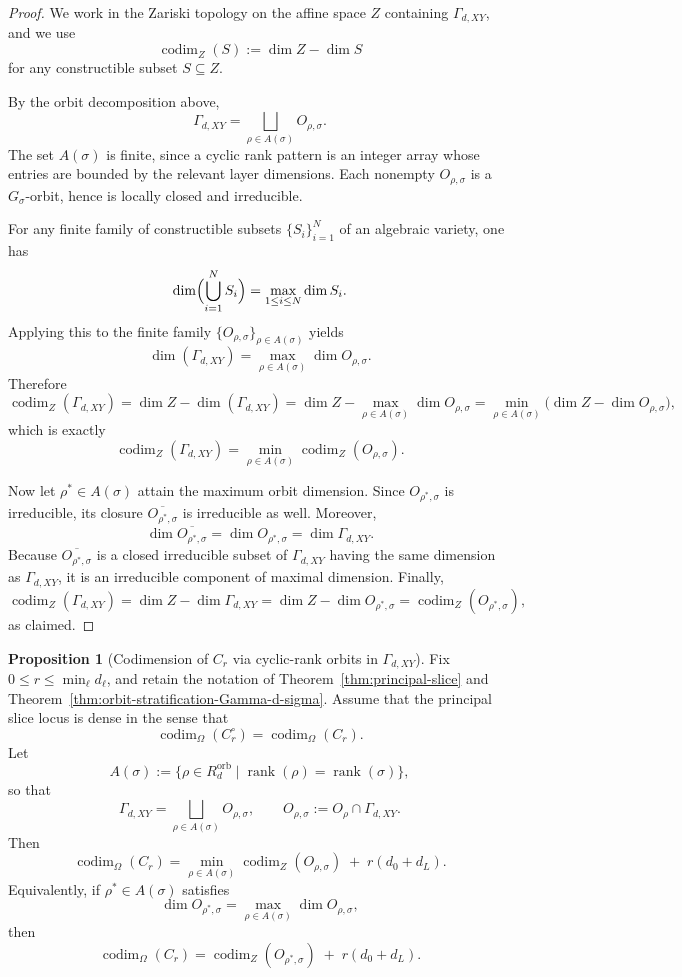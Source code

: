 \documentclass{article}
\newcommand{\rank}{\operatorname{rank}}
\newcommand{\codim}{\operatorname{codim}}
\theoremstyle{definition}
\newtheorem{proposition}[theorem]{Proposition}
\begin{document}
\begin{proof}
We work in the Zariski topology on the affine space $Z$ containing $\Gamma_{d,XY}$, and we use
\[
\codim_Z(S):=\dim Z-\dim S
\]
for any constructible subset $S\subseteq Z$.

By the orbit decomposition above,
\[
\Gamma_{d,XY}
=
\bigsqcup_{\rho \in A(\sigma)} O_{\rho,\sigma}.
\]
The set $A(\sigma)$ is finite, since a cyclic rank pattern is an integer array whose entries are
bounded by the relevant layer dimensions. Each nonempty $O_{\rho,\sigma}$ is a $G_\sigma$-orbit,
hence is locally closed and irreducible.

For any finite family of constructible subsets $\{S_i\}_{i=1}^N$ of an algebraic variety, one has
\[
\dim\Bigl(\bigcup_{i=1}^N S_i\Bigr)=\max_{1\le i\le N}\dim S_i.
\]
Applying this to the finite family $\{O_{\rho,\sigma}\}_{\rho\in A(\sigma)}$ yields
\[
\dim(\Gamma_{d,XY})
=
\max_{\rho\in A(\sigma)} \dim O_{\rho,\sigma}.
\]
Therefore
\[
\codim_Z(\Gamma_{d,XY})
=
\dim Z-\dim(\Gamma_{d,XY})
=
\dim Z-\max_{\rho\in A(\sigma)} \dim O_{\rho,\sigma}
=
\min_{\rho\in A(\sigma)} \bigl(\dim Z-\dim O_{\rho,\sigma}\bigr),
\]
which is exactly
\[
\codim_Z(\Gamma_{d,XY})
=
\min_{\rho\in A(\sigma)} \codim_Z(O_{\rho,\sigma}).
\]

Now let $\rho^\ast\in A(\sigma)$ attain the maximum orbit dimension. Since $O_{\rho^\ast,\sigma}$
is irreducible, its closure $\overline{O_{\rho^\ast,\sigma}}$ is irreducible as well. Moreover,
\[
\dim \overline{O_{\rho^\ast,\sigma}}
=
\dim O_{\rho^\ast,\sigma}
=
\dim \Gamma_{d,XY}.
\]
Because $\overline{O_{\rho^\ast,\sigma}}$ is a closed irreducible subset of $\Gamma_{d,XY}$ having
the same dimension as $\Gamma_{d,XY}$, it is an irreducible component of maximal dimension.
Finally,
\[
\codim_Z(\Gamma_{d,XY})
=
\dim Z-\dim \Gamma_{d,XY}
=
\dim Z-\dim O_{\rho^\ast,\sigma}
=
\codim_Z(O_{\rho^\ast,\sigma}),
\]
as claimed.
\end{proof}
\begin{proposition}[Codimension of $C_r$ via cyclic-rank orbits in $\Gamma_{d,XY}$]
Fix $0 \le r \le \min_\ell d_\ell$, and retain the notation of Theorem~\ref{thm:principal-slice}
and Theorem~\ref{thm:orbit-stratification-Gamma-d-sigma}. Assume that the principal slice locus is
dense in the sense that
\[
\codim_\Omega(C_r^\circ)=\codim_\Omega(C_r).
\]
Let
\[
A(\sigma)
:=
\bigl\{
\rho\in R_d^{\mathrm{orb}}
\;\big|\;
\rank(\rho)=\rank(\sigma)
\bigr\},
\]
so that
\[
\Gamma_{d,XY}
=
\bigsqcup_{\rho\in A(\sigma)} O_{\rho,\sigma},
\qquad
O_{\rho,\sigma}:=O_\rho\cap \Gamma_{d,XY}.
\]
Then
\[
\codim_\Omega(C_r)
=
\min_{\rho\in A(\sigma)} \codim_Z(O_{\rho,\sigma})
\;+\;
r(d_0+d_L).
\]
Equivalently, if $\rho^\ast\in A(\sigma)$ satisfies
\[
\dim O_{\rho^\ast,\sigma}
=
\max_{\rho\in A(\sigma)} \dim O_{\rho,\sigma},
\]
then
\[
\codim_\Omega(C_r)
=
\codim_Z(O_{\rho^\ast,\sigma})
\;+\;
r(d_0+d_L).
\]
\end{proposition}
\end{document}
